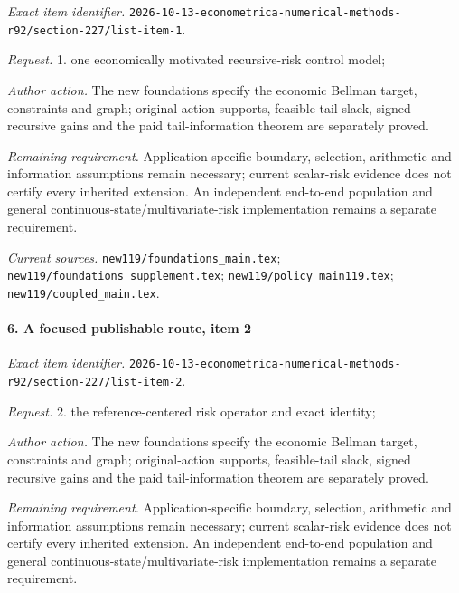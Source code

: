 \emph{Exact item identifier.} \nolinkurl{2026-10-13-econometrica-numerical-methods-r92/section-227/list-item-1}.

\par\emph{Request.} 1. one economically motivated recursive-risk control model;

\par\emph{Author action.} The new foundations specify the economic Bellman target, constraints and graph; original-action supports, feasible-tail slack, signed recursive gains and the paid tail-information theorem are separately proved.

\par\emph{Remaining requirement.} Application-specific boundary, selection, arithmetic and information assumptions remain necessary; current scalar-risk evidence does not certify every inherited extension. An independent end-to-end population and general continuous-state/\allowbreak{}multivariate-risk implementation remains a separate requirement.

\par\emph{Current sources.} \nolinkurl{new119/foundations_main.tex}; \nolinkurl{new119/foundations_supplement.tex}; \nolinkurl{new119/policy_main119.tex}; \nolinkurl{new119/coupled_main.tex}.

\paragraph{6. A focused publishable route, item 2}

\emph{Exact item identifier.} \nolinkurl{2026-10-13-econometrica-numerical-methods-r92/section-227/list-item-2}.

\par\emph{Request.} 2. the reference-centered risk operator and exact identity;

\par\emph{Author action.} The new foundations specify the economic Bellman target, constraints and graph; original-action supports, feasible-tail slack, signed recursive gains and the paid tail-information theorem are separately proved.

\par\emph{Remaining requirement.} Application-specific boundary, selection, arithmetic and information assumptions remain necessary; current scalar-risk evidence does not certify every inherited extension. An independent end-to-end population and general continuous-state/\allowbreak{}multivariate-risk implementation remains a separate requirement.

